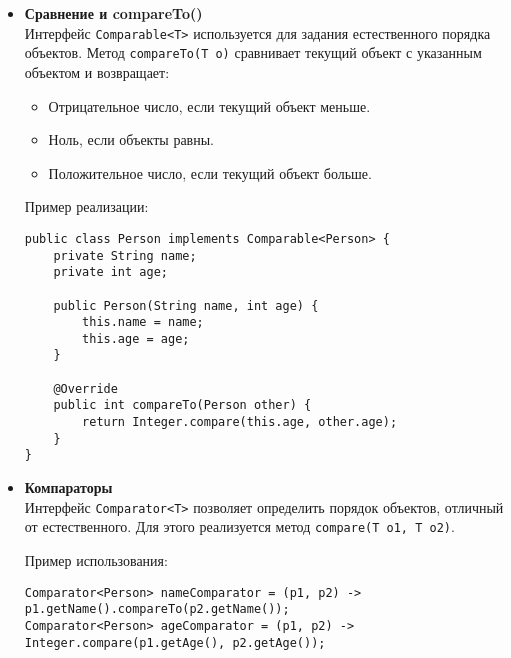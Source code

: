 \begin{itemize}
    \item \textbf{Сравнение и compareTo()} \\
    Интерфейс \texttt{Comparable<T>} используется для задания естественного порядка объектов. Метод \texttt{compareTo(T o)} сравнивает текущий объект с указанным объектом и возвращает:

    \begin{itemize}
        \item Отрицательное число, если текущий объект меньше.
        \item Ноль, если объекты равны.
        \item Положительное число, если текущий объект больше.
    \end{itemize}

    Пример реализации:
    \begin{verbatim}
public class Person implements Comparable<Person> {
    private String name;
    private int age;

    public Person(String name, int age) {
        this.name = name;
        this.age = age;
    }

    @Override
    public int compareTo(Person other) {
        return Integer.compare(this.age, other.age);
    }
}
    \end{verbatim}
    
    \item \textbf{Компараторы} \\
    Интерфейс \texttt{Comparator<T>} позволяет определить порядок объектов, отличный от естественного. Для этого реализуется метод \texttt{compare(T o1, T o2)}.

    Пример использования:
    \begin{verbatim}
Comparator<Person> nameComparator = (p1, p2) -> p1.getName().compareTo(p2.getName());
Comparator<Person> ageComparator = (p1, p2) -> Integer.compare(p1.getAge(), p2.getAge());
    \end{verbatim}
\end{itemize}
